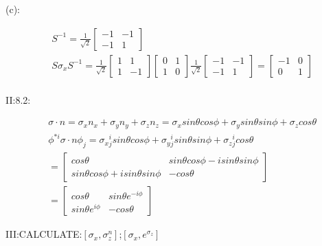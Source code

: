 \documentclass{article}
\begin{document}
(c):

\begin{align*}
  &S^{-1}=\frac1{\sqrt{2}}\begin{bmatrix}-1&-1\\-1&1\end{bmatrix} \\
  &S\sigma_xS^{-1}=\frac1{\sqrt{2}}\begin{bmatrix}1&1\\1&-1\end{bmatrix}\begin{bmatrix}0&1\\1&0\end{bmatrix}\frac1{\sqrt{2}}\begin{bmatrix}-1&-1\\-1&1\end{bmatrix}=\begin{bmatrix}-1&0\\0&1\end{bmatrix} \\
\end{align*}

II:8.2:

\begin{align*}
&\sigma\cdot n=\sigma_x n_x+\sigma_y n_y+\sigma_z n_z=\sigma_xsin\theta cos\phi+\sigma_ysin\theta sin\phi+\sigma_zcos\theta\\
&\phi^{*i}\sigma\cdot n\phi_j=\sigma_x{^i_j}sin\theta cos\phi+\sigma_y{^i_j}sin\theta sin\phi+\sigma_z{^i_j}cos\theta \\
&=\begin{bmatrix}cos\theta&sin\theta cos\phi-isin\theta sin\phi\\sin\theta cos\phi+isin\theta sin\phi&-cos\theta\end{bmatrix}\\
&=\begin{bmatrix}cos\theta&sin\theta e^{-i\phi}\\sin\theta e^{i\phi}&-cos\theta\end{bmatrix}
\end{align*}

III:CALCULATE:$[\sigma_x,\sigma_z^n]$;$[\sigma_x,e^{\sigma_z}]$
\end{document}
